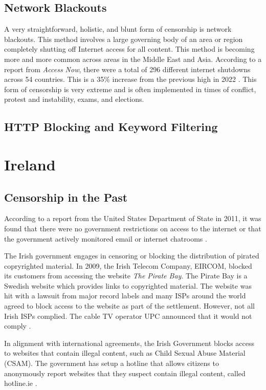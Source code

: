\subsection{Network Blackouts}

A very straightforward, holistic, and blunt form of censorship is network blackouts. This method involves a large governing body of an area or region completely shutting off Internet access for all content. This method is becoming more and more common across areas in the Middle East and Asia. According to a report from \textit{Access Now}, there were a total of 296 different internet shutdowns across 54 countries. This is a 35\% increase from the previous high in 2022 \cite{inetenetBlackouts}. This form of censorship is very extreme and is often implemented in times of conflict, protest and instability, exams, and elections. 

\subsection{HTTP Blocking and Keyword Filtering}



\section{Ireland}

\subsection{Censorship in the Past}

According to a report from the United States Department of State in 2011, it was found that there were no government restrictions on access to the internet or that the government actively monitored email or internet chatrooms \cite{stateTechnicalDifficulties}.

The Irish government engages in censoring or blocking the distribution of pirated copryrighted material. In 2009, the Irish Telecom Company, EIRCOM, blocked its customers from accessing the website \textit{The Pirate Bay}. The Pirate Bay is a Swedish website which provides links to copyrighted material. The website was hit with a lawsuit from major record labels and many ISPs around the world agreed to block access to the website as part of the settlement. However, not all Irish ISPs complied. The cable TV operator UPC announced that it would not comply \cite{irishtimesEircomBlock}. 

In alignment with international agreements, the Irish Government blocks access to websites that contain illegal content, such as Child Sexual Abuse Material (CSAM). The government has setup a hotline that allows citizens to anonymously report websites that they suspect contain illegal content, called hotline.ie \cite{hotlineAboutx2013}.

